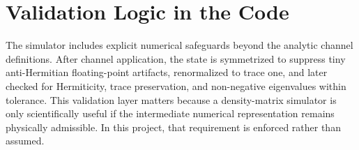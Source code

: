 \section{Validation Logic in the Code}

The simulator includes explicit numerical safeguards beyond the analytic channel definitions. After channel application, the state is symmetrized to suppress tiny anti-Hermitian floating-point artifacts, renormalized to trace one, and later checked for Hermiticity, trace preservation, and non-negative eigenvalues within tolerance. This validation layer matters because a density-matrix simulator is only scientifically useful if the intermediate numerical representation remains physically admissible. In this project, that requirement is enforced rather than assumed.
